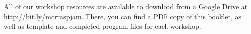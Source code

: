 All of our workshop resources are available to download from a Google Drive at
\url{http://bit.ly/mcrraspjam}.
There, you can find a PDF copy of this booklet, as well as template and completed program files for each workshop.